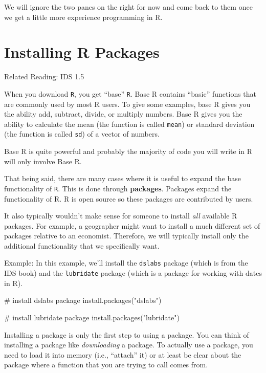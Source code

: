 \documentclass[
  letterpaper,
  DIV=11,
  numbers=noendperiod]{scrreprt}
\newenvironment{Shaded}{\begin{snugshade}}{\end{snugshade}}
\newcommand{\CommentTok}[1]{\textcolor[rgb]{0.37,0.37,0.37}{#1}}
\newcommand{\FunctionTok}[1]{\textcolor[rgb]{0.28,0.35,0.67}{#1}}
\newcommand{\NormalTok}[1]{\textcolor[rgb]{0.00,0.23,0.31}{#1}}
\newcommand{\StringTok}[1]{\textcolor[rgb]{0.13,0.47,0.30}{#1}}
\begin{document}
We will ignore the two panes on the right for now and come back to them
once we get a little more experience programming in R.

\section{Installing R Packages}\label{installing-r-packages}

Related Reading: IDS 1.5

When you download \texttt{R}, you get ``base'' \texttt{R}. Base R
contains ``basic'' functions that are commonly used by most R users. To
give some examples, base R gives you the ability add, subtract, divide,
or multiply numbers. Base R gives you the ability to calculate the mean
(the function is called \texttt{mean}) or standard deviation (the
function is called \texttt{sd}) of a vector of numbers.

Base R is quite powerful and probably the majority of code you will
write in R will only involve Base R.

That being said, there are many cases where it is useful to expand the
base functionality of \texttt{R}. This is done through
\textbf{packages}. Packages expand the functionality of R. R is open
source so these packages are contributed by users.

It also typically wouldn't make sense for someone to install \emph{all}
available R packages. For example, a geographer might want to install a
much different set of packages relative to an economist. Therefore, we
will typically install only the additional functionality that we
specifically want.

{Example: }In this example, we'll install the \texttt{dslabs} package
(which is from the IDS book) and the \texttt{lubridate} package (which
is a package for working with dates in R).

\begin{Shaded}
\begin{Highlighting}[]
\CommentTok{\# install dslabs package}
\FunctionTok{install.packages}\NormalTok{(}\StringTok{"dslabs"}\NormalTok{)}

\CommentTok{\# install lubridate package}
\FunctionTok{install.packages}\NormalTok{(}\StringTok{"lubridate"}\NormalTok{)}
\end{Highlighting}
\end{Shaded}

Installing a package is only the first step to using a package. You can
think of installing a package like \emph{downloading} a package. To
actually use a package, you need to load it into memory (i.e.,
``attach'' it) or at least be clear about the package where a function
that you are trying to call comes from.
\end{document}
